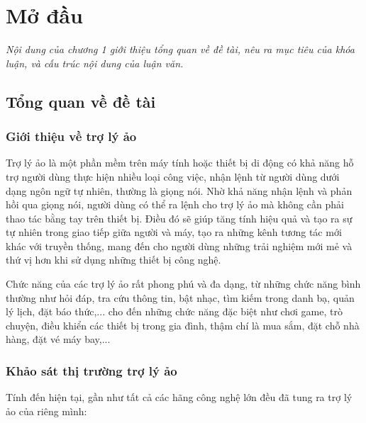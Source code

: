 
\chapter{Mở đầu}
\textit{Nội dung của chương 1 giới thiệu tổng quan về đề tài, nêu ra mục tiêu của khóa luận, và cấu trúc nội dung của luận văn.}
\ifpdf
    \graphicspath{{Chapter1/Chapter1Figs/PNG/}{Chapter1/Chapter1Figs/PDF/}{Chapter1/Chapter1Figs/}}
\else
    \graphicspath{{Chapter1/Chapter1Figs/EPS/}{Chapter1/Chapter1Figs/}}
\fi

\section{Tổng quan về đề tài}

\subsection{Giới thiệu về trợ lý ảo}

Trợ lý ảo là một phần mềm trên máy tính hoặc thiết bị di động có khả năng hỗ trợ người dùng thực hiện nhiều loại công việc, nhận lệnh từ người dùng dưới dạng ngôn ngữ tự nhiên, thường là giọng nói. Nhờ khả năng nhận lệnh và phản hồi qua giọng nói, người dùng có thể ra lệnh cho trợ lý ảo mà không cần phải thao tác bằng tay trên thiết bị. Điều đó sẽ giúp tăng tính hiệu quả và tạo ra sự tự nhiên trong giao tiếp giữa người và máy, tạo ra những kênh tương tác mới khác với truyền thống, mang đến cho người dùng những trải nghiệm mới mẻ và thứ vị hơn khi sử dụng những thiết bị công nghệ.

Chức năng của các trợ lý ảo rất phong phú và đa dạng, từ những chức năng bình thường như hỏi đáp, tra cứu thông tin, bật nhạc, tìm kiếm trong danh bạ, quản lý lịch, đặt báo thức,... cho đến những chức năng đặc biệt như chơi game, trò chuyện, điều khiển các thiết bị trong gia đình, thậm chí là mua sắm, đặt chỗ nhà hàng, đặt vé máy bay,...

\subsection{Khảo sát thị trường trợ lý ảo}

Tính đến hiện tại, gần như tất cả các hãng công nghệ lớn đều đã tung ra trợ lý ảo của riêng mình:

